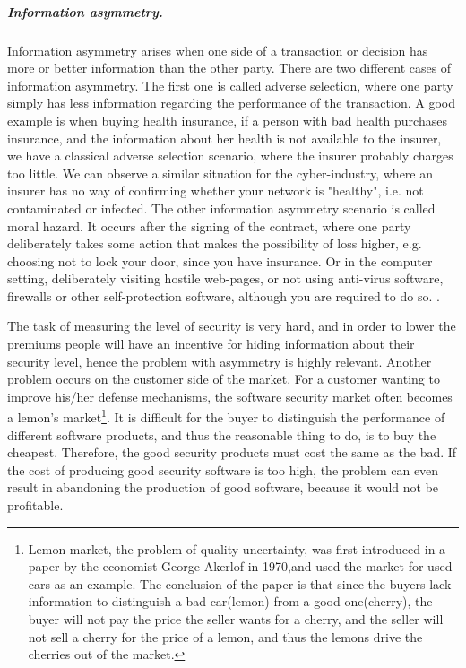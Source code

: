 \subparagraph{Information asymmetry.}
Information asymmetry arises when one side of a transaction or decision has more or better information than the other party. There are two different cases of information asymmetry. The first one is called adverse selection, where one party simply has less information regarding the performance of the transaction. A good example is when buying health insurance, if a person with bad health purchases insurance, and the information about her health is not available to the insurer, we have a classical adverse selection scenario, where the insurer probably charges too little. We can observe a similar situation for the cyber-industry, where an insurer has no way of confirming whether your network is "healthy", i.e. not contaminated or infected. 
The other information asymmetry scenario is called moral hazard. It occurs after the signing of the contract, where one party deliberately takes some action that makes the possibility of loss higher, e.g. choosing not to lock your door, since you have insurance. Or in the computer setting, deliberately visiting hostile web-pages, or not using anti-virus software, firewalls or other self-protection software, although you are required to do so. \cite{solutiontoinfoasym}.
    
    
The task of measuring the level of security is very hard, and in order to lower the premiums people will have an incentive for hiding information about their security level, hence the problem with asymmetry is highly relevant. Another problem occurs on the customer side of the market. For a customer wanting to improve his/her defense mechanisms, the software security market often becomes a lemon's market\footnote{Lemon market, the problem of quality uncertainty, was first introduced in a paper \cite{lemonpaper} by the economist George Akerlof in 1970,and used the market for used cars as an example.\cite{lemon} The conclusion of the paper is that since the buyers lack information to distinguish a bad car(lemon) from a good one(cherry), the buyer will not pay the price the seller wants for a cherry, and the seller will not sell a cherry for the price of a lemon, and thus the lemons drive the cherries out of the market.}. 
It is difficult for the buyer to distinguish the performance of different software products, and thus the reasonable thing to do, is to buy the cheapest. Therefore, the good security products must cost the same as the bad. If the cost of producing good security software is too high, the problem can even result in abandoning the production of good software, because it would not be profitable.

